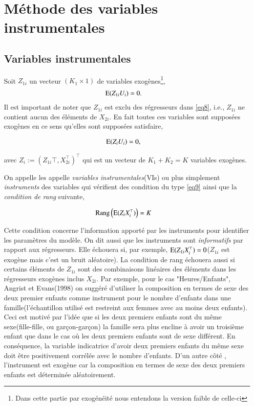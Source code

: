 \documentclass[10pt, reqno]{amsart}
\begin{document}
\section{Méthode des variables instrumentales}

\subsection{Variables instrumentales}
Soit $Z_{1i}$ un vecteur $(K_1\times 1)$ de 
variables exogènes\footnote{Dans cette partie par exogénéité nous entendons la version faible de celle-ci},
\begin{align*}
\operatorname{E}(Z_{1i}U_i) &= 0.
\end{align*}
Il est important de noter que  $Z_{1i}$ est exclu des régresseurs dans \eqref{eq8}, i.e., $Z_{1i}$ 
ne contient aucun des éléments de $X_{2i}$. En fait toutes ces variables sont supposées exogènes en ce sens 
qu'elles sont supposées satisfaire, 

\begin{align}
	\operatorname{E}(Z_iU_i) &= 0,
\label{eq9}
\end{align}

avec $Z_i:=(Z_{1i}\top, X_{2i}^\top)^\top$ qui est un vecteur de $K_1 + K_2 = K$ variables exogènes.

On appelle les appelle \emph{variables instrumentales}(VIs) ou plus simplement \emph{instruments}
des variables qui vérifient des condition du type \eqref{eq9} ainsi que la \emph{condition de rang} suivante,

\begin{align}
	\mathrm{Rang}\left(\operatorname{E}(Z_iX_i^\top)\right) &= K
	\label{eq10}
\end{align}

Cette condition concerne l'information apporté par les instruments pour identifier les paramètres du modèle. 
On dit aussi que les instruments sont \emph{informatifs} par rapport aux régresseurs. 
Elle échouera si, par exemple, $\operatorname{E}(Z_{1i}X_i^\top) = 0$($Z_{1i}$ est exogène mais c'est un bruit aléatoire). 
La condition de rang échouera aussi si certains éléments de $Z_{1i}$ sont des 
combinaisons linéaires des éléments dans les régresseurs exogènes inclus $X_{2i}$.
Par exemple, pour le cas "Heures/Enfants", Angrist et Evans(1998) on suggéré d'utiliser la composition 
en termes de sexe des deux premier enfants  comme instrument pour le nombre d'enfants dans une 
famille(l'échantillon utilisé est restreint  aux femmes avec au moins deux enfants). 
Ceci est motivé par l'idée que si les deux premiers enfants sont du même sexe(fille-fille, ou garçon-garçon) 
la famille sera plus encline à avoir un troisième enfant que dans le cas où les deux premiers enfants sont 
de sexe différent. En conséquence, la variable indicatrice d'avoir deux premiers enfants du même sexe 
doit être positivement corrélée avec le nombre d'enfants. D'un autre côté , l'instrument est 
exogène car la composition en termes de sexe des deux premiers enfants est déterminée aléatoirement.
\end{document}
